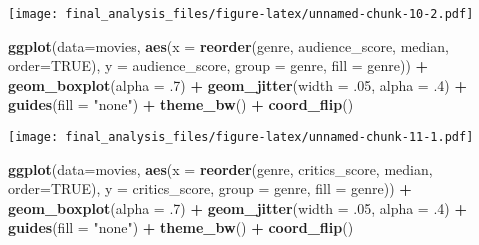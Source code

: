 \documentclass[]{article}
\newenvironment{Shaded}{\begin{snugshade}}{\end{snugshade}}
\newcommand{\KeywordTok}[1]{\textcolor[rgb]{0.13,0.29,0.53}{\textbf{#1}}}
\newcommand{\DataTypeTok}[1]{\textcolor[rgb]{0.13,0.29,0.53}{#1}}
\newcommand{\DecValTok}[1]{\textcolor[rgb]{0.00,0.00,0.81}{#1}}
\newcommand{\StringTok}[1]{\textcolor[rgb]{0.31,0.60,0.02}{#1}}
\newcommand{\OtherTok}[1]{\textcolor[rgb]{0.56,0.35,0.01}{#1}}
\newcommand{\OperatorTok}[1]{\textcolor[rgb]{0.81,0.36,0.00}{\textbf{#1}}}
\newcommand{\NormalTok}[1]{#1}
\begin{document}
\texttt{[image: final\_analysis\_files/figure-latex/unnamed-chunk-10-2.pdf]}

\begin{Shaded}
\begin{Highlighting}[]
\KeywordTok{ggplot}\NormalTok{(}\DataTypeTok{data=}\NormalTok{movies, }\KeywordTok{aes}\NormalTok{(}\DataTypeTok{x =} \KeywordTok{reorder}\NormalTok{(genre, audience_score, median, }\DataTypeTok{order=}\OtherTok{TRUE}\NormalTok{), }\DataTypeTok{y =}\NormalTok{ audience_score, }\DataTypeTok{group =}\NormalTok{ genre, }\DataTypeTok{fill =}\NormalTok{ genre)) }\OperatorTok{+}\StringTok{ }\KeywordTok{geom_boxplot}\NormalTok{(}\DataTypeTok{alpha =}\NormalTok{ .}\DecValTok{7}\NormalTok{) }\OperatorTok{+}\StringTok{ }\KeywordTok{geom_jitter}\NormalTok{(}\DataTypeTok{width =}\NormalTok{ .}\DecValTok{05}\NormalTok{, }\DataTypeTok{alpha =}\NormalTok{ .}\DecValTok{4}\NormalTok{) }\OperatorTok{+}\StringTok{ }\KeywordTok{guides}\NormalTok{(}\DataTypeTok{fill =} \StringTok{"none"}\NormalTok{) }\OperatorTok{+}\StringTok{ }\KeywordTok{theme_bw}\NormalTok{() }\OperatorTok{+}\StringTok{ }\KeywordTok{coord_flip}\NormalTok{()}
\end{Highlighting}
\end{Shaded}

\texttt{[image: final\_analysis\_files/figure-latex/unnamed-chunk-11-1.pdf]}

\begin{Shaded}
\begin{Highlighting}[]
\KeywordTok{ggplot}\NormalTok{(}\DataTypeTok{data=}\NormalTok{movies, }\KeywordTok{aes}\NormalTok{(}\DataTypeTok{x =} \KeywordTok{reorder}\NormalTok{(genre, critics_score, median, }\DataTypeTok{order=}\OtherTok{TRUE}\NormalTok{), }\DataTypeTok{y =}\NormalTok{ critics_score, }\DataTypeTok{group =}\NormalTok{ genre, }\DataTypeTok{fill =}\NormalTok{ genre)) }\OperatorTok{+}\StringTok{ }\KeywordTok{geom_boxplot}\NormalTok{(}\DataTypeTok{alpha =}\NormalTok{ .}\DecValTok{7}\NormalTok{) }\OperatorTok{+}\StringTok{ }\KeywordTok{geom_jitter}\NormalTok{(}\DataTypeTok{width =}\NormalTok{ .}\DecValTok{05}\NormalTok{, }\DataTypeTok{alpha =}\NormalTok{ .}\DecValTok{4}\NormalTok{) }\OperatorTok{+}\StringTok{ }\KeywordTok{guides}\NormalTok{(}\DataTypeTok{fill =} \StringTok{"none"}\NormalTok{) }\OperatorTok{+}\StringTok{ }\KeywordTok{theme_bw}\NormalTok{() }\OperatorTok{+}\StringTok{ }\KeywordTok{coord_flip}\NormalTok{()}
\end{Highlighting}
\end{Shaded}
\end{document}
